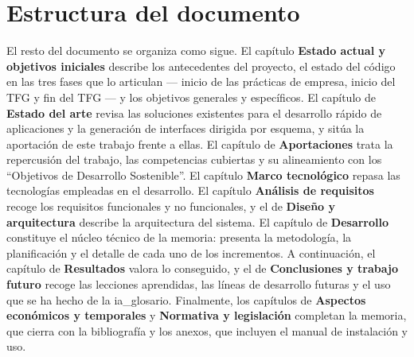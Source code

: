 \section{Estructura del documento}
El resto del documento se organiza como sigue. El capítulo
\textbf{Estado actual y objetivos iniciales} describe los antecedentes del
proyecto, el estado del código en las tres fases que lo articulan --- inicio de
las prácticas de empresa, inicio del TFG y fin del TFG --- y los objetivos
generales y específicos. El
capítulo de \textbf{Estado del arte} revisa las soluciones existentes para el
desarrollo rápido de aplicaciones y la generación de interfaces dirigida por
esquema, y sitúa la aportación de este trabajo frente a ellas. El
capítulo de \textbf{Aportaciones} trata la repercusión del trabajo, las
competencias cubiertas y su alineamiento con los ``Objetivos de Desarrollo
Sostenible''. El capítulo \textbf{Marco tecnológico} repasa
las tecnologías empleadas en el desarrollo. El capítulo \textbf{Análisis de requisitos}
recoge los requisitos funcionales y no funcionales, y el de \textbf{Diseño y
arquitectura} describe la arquitectura del sistema. El capítulo de
\textbf{Desarrollo} constituye el núcleo técnico de la memoria: presenta la
metodología, la planificación y el detalle de cada uno de los incrementos. A
continuación, el capítulo de \textbf{Resultados} valora lo conseguido, y el de
\textbf{Conclusiones y trabajo futuro} recoge las lecciones aprendidas, las
líneas de desarrollo futuras y el uso que se ha hecho de la \gls{ia_glosario}.
Finalmente, los capítulos de \textbf{Aspectos económicos y temporales} y
\textbf{Normativa y legislación} completan la memoria, que cierra con la
bibliografía y los anexos, que incluyen el manual de instalación y uso.

